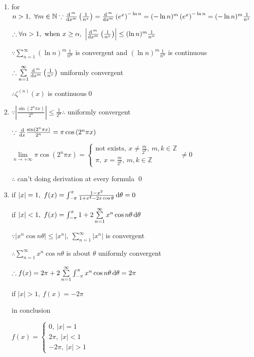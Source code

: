 \begin{enumerate}[1]
    \item for $n>1,\ \forall m \in \mathbb{N} \because \frac{\dif \, ^{m}}{\dif  x^{m}}\left(\frac{1}{n^{x}}\right)=\frac{\dif \, ^{m}}{\dif  x^{m}}\left(e^{x}\right)^{-\ln n}=(-\ln n)^{m}\left(e^{x}\right)^{-\ln n}=(-\ln n)^{m} \frac{1}{n^{x}}$
    \par $\therefore \forall \alpha>1,\ \text{when}\  x\geq \alpha,\ \left| \frac{\dif \, ^{m}}{\dif  x^{m}}\left(\frac{1}{n^{x}}\right)\right| \leq (\ln n)^{m} \frac{1}{n^{\alpha}}$
    \par $\because \sum \limits_{n=1}^{\infty} (\ln n)^{m} \frac{1}{n^{\alpha}}$ is convergent and $ (\ln n)^{m} \frac{1}{n^{x}} $ is continuous
    \par $\therefore \sum \limits_{n=1}^{\infty} \frac{\dif \, ^{m}}{\dif  x^{m}}\left(\frac{1}{n^{x}}\right)$ uniformly convergent
    \par $\therefore \zeta^{(n)}(x)$ is continuous\qed

    \item $\because \left|\frac{\sin \left(2^{n} \pi x\right)}{2^{n}}\right| \leq \frac{1}{2^{n}} \therefore $ uniformly convergent
    \par $\because \frac{\dif}{\dif x}\frac{\sin \left(2^{n} \pi x\right)}{2^{n}}=\pi \cos \left(2^{n} \pi x\right)$
    \par $ \lim \limits_{n \to +\infty}\pi \cos \left(2^{n} \pi x\right) = \begin{cases}  \text{not exists},\ x \not= \frac{m}{2^k},\ m,k \in \mathbb{Z}\\ \pi ,\ x = \frac{m}{2^k},\ m,k \in \mathbb{Z} \end{cases} \not= 0$
    \par $\therefore $ can't doing derivation at every formula \qed

    \item 
    if $|x| = 1,\ f(x)=\int_{-\pi}^{\pi} \frac{1-x^{2}}{1+x^{2}-2 x \cos \theta}\dif \theta=0$
    \par if $|x| < 1,\ f(x) = \int_{-\pi}^{\pi} 1+ 2\sum \limits_{n=1}^{\infty}  x^n \cos n\theta \dif \theta$
    \par $\because | x^n \cos n\theta|\leq |x^n|,\ \sum \limits_{n=1}^{\infty} |x^n| $ is convergent
    \par $\therefore \sum \limits_{n=1}^{\infty} x^n \cos n\theta $ is about $\theta$ uniformly convergent
    \par $\therefore f(x) =2\pi+ 2\sum \limits_{n=1}^{\infty}  \int_{-\pi}^{\pi}x^n \cos n\theta \dif \theta=2\pi$
    \par if $|x|> 1,\ f(x)=-2\pi$
    \par in conclusion
    \par $f(x)=\begin{cases}  0,\ |x| = 1\\ 2\pi ,\ |x| <1 \\-2\pi,\ |x|>1 \end{cases} $

\end{enumerate}

